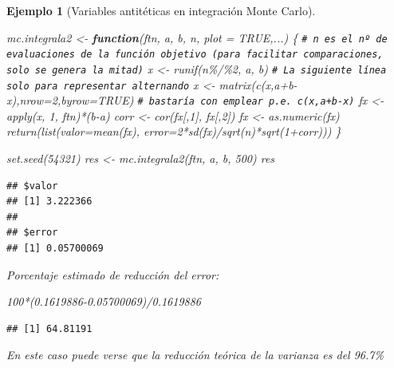 \documentclass[
]{book}
\newenvironment{Shaded}{\begin{snugshade}}{\end{snugshade}}
\newcommand{\AttributeTok}[1]{\textcolor[rgb]{0.77,0.63,0.00}{#1}}
\newcommand{\CommentTok}[1]{\textcolor[rgb]{0.56,0.35,0.01}{\textit{#1}}}
\newcommand{\ConstantTok}[1]{\textcolor[rgb]{0.00,0.00,0.00}{#1}}
\newcommand{\ControlFlowTok}[1]{\textcolor[rgb]{0.13,0.29,0.53}{\textbf{#1}}}
\newcommand{\DecValTok}[1]{\textcolor[rgb]{0.00,0.00,0.81}{#1}}
\newcommand{\FloatTok}[1]{\textcolor[rgb]{0.00,0.00,0.81}{#1}}
\newcommand{\FunctionTok}[1]{\textcolor[rgb]{0.00,0.00,0.00}{#1}}
\newcommand{\NormalTok}[1]{#1}
\newcommand{\OtherTok}[1]{\textcolor[rgb]{0.56,0.35,0.01}{#1}}
\newcommand{\SpecialCharTok}[1]{\textcolor[rgb]{0.00,0.00,0.00}{#1}}
\theoremstyle{break}
\newtheorem{example}{Ejemplo}[chapter]
\theoremstyle{nonumberplain}
\renewcommand{\CommentTok}[1]{\textcolor[rgb]{0.41,0.41,0.41}{\texttt{#1}}}
\begin{document}
\begin{example}[Variables antitéticas en integración Monte Carlo]
\begin{Shaded}
\begin{Highlighting}[]
\NormalTok{mc.integrala2 }\OtherTok{\textless{}{-}} \ControlFlowTok{function}\NormalTok{(ftn, a, b, n, }\AttributeTok{plot =} \ConstantTok{TRUE}\NormalTok{,...) \{}
  \CommentTok{\# n es el nº de evaluaciones de la función objetivo (para facilitar comparaciones, solo se genera la mitad)}
\NormalTok{  x }\OtherTok{\textless{}{-}} \FunctionTok{runif}\NormalTok{(n}\SpecialCharTok{\%/\%}\DecValTok{2}\NormalTok{, a, b)}
  \CommentTok{\# La siguiente línea solo para representar alternando}
\NormalTok{  x }\OtherTok{\textless{}{-}} \FunctionTok{matrix}\NormalTok{(}\FunctionTok{c}\NormalTok{(x,a}\SpecialCharTok{+}\NormalTok{b}\SpecialCharTok{{-}}\NormalTok{x),}\AttributeTok{nrow=}\DecValTok{2}\NormalTok{,}\AttributeTok{byrow=}\ConstantTok{TRUE}\NormalTok{)}
  \CommentTok{\# bastaría con emplear p.e. c(x,a+b{-}x)}
\NormalTok{  fx }\OtherTok{\textless{}{-}} \FunctionTok{apply}\NormalTok{(x, }\DecValTok{1}\NormalTok{,  ftn)}\SpecialCharTok{*}\NormalTok{(b}\SpecialCharTok{{-}}\NormalTok{a)}
\NormalTok{  corr }\OtherTok{\textless{}{-}} \FunctionTok{cor}\NormalTok{(fx[,}\DecValTok{1}\NormalTok{], fx[,}\DecValTok{2}\NormalTok{])}
\NormalTok{  fx }\OtherTok{\textless{}{-}} \FunctionTok{as.numeric}\NormalTok{(fx)}
  \FunctionTok{return}\NormalTok{(}\FunctionTok{list}\NormalTok{(}\AttributeTok{valor=}\FunctionTok{mean}\NormalTok{(fx), }\AttributeTok{error=}\DecValTok{2}\SpecialCharTok{*}\FunctionTok{sd}\NormalTok{(fx)}\SpecialCharTok{/}\FunctionTok{sqrt}\NormalTok{(n)}\SpecialCharTok{*}\FunctionTok{sqrt}\NormalTok{(}\DecValTok{1}\SpecialCharTok{+}\NormalTok{corr)))}
\NormalTok{\}}

\FunctionTok{set.seed}\NormalTok{(}\DecValTok{54321}\NormalTok{)}
\NormalTok{res }\OtherTok{\textless{}{-}} \FunctionTok{mc.integrala2}\NormalTok{(ftn, a, b, }\DecValTok{500}\NormalTok{)}
\NormalTok{res}
\end{Highlighting}
\end{Shaded}

\begin{verbatim}
## $valor
## [1] 3.222366
## 
## $error
## [1] 0.05700069
\end{verbatim}

Porcentaje estimado de reducción del error:

\begin{Shaded}
\begin{Highlighting}[]
\DecValTok{100}\SpecialCharTok{*}\NormalTok{(}\FloatTok{0.1619886{-}0.05700069}\NormalTok{)}\SpecialCharTok{/}\FloatTok{0.1619886}
\end{Highlighting}
\end{Shaded}

\begin{verbatim}
## [1] 64.81191
\end{verbatim}

En este caso puede verse que la reducción teórica de la varianza es del 96.7\%
\end{example}
\end{document}

